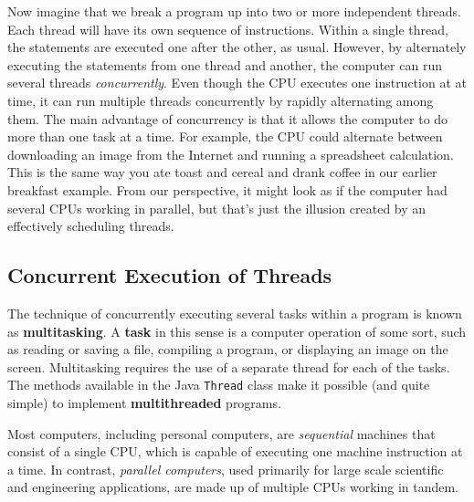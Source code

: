 Now imagine that we break a program up into two or more independent
threads.  Each thread will have its own sequence of instructions.
Within a single thread, the statements are executed one after the
other, as usual.  However, by alternately executing the statements
from one thread and another, the computer can run several threads {\it
concurrently}.  Even though the CPU executes one instruction at at
time, it can run multiple threads concurrently by rapidly alternating
among them. The main advantage of concurrency is that it allows the
computer to do more than one task at a time.  For example, the CPU
could alternate between downloading an image from the Internet and
running a spreadsheet calculation. This is the same way you ate toast
and cereal and drank coffee in our earlier breakfast example.  From
our perspective, it might look as if the computer had several CPUs
working in parallel, but that's just the illusion created by an
effectively scheduling threads.




\subsection{Concurrent Execution of Threads}
\noindent The technique of concurrently executing several tasks within a program
is known as {\bf multitasking}. A {\bf task} in this sense is a
computer operation of some sort, such as reading or saving a file,
compiling a program, or displaying an image on the screen.  Multitasking
requires the use of a separate thread for each of the tasks.  The
methods available in the Java {\tt Thread} class make it possible (and
quite simple) to implement {\bf multithreaded} programs.

Most computers, including personal computers, are {\it sequential}
machines that consist of a single CPU, which is capable of executing
one machine instruction at a time.  In contrast, {\it parallel
computers}, used primarily for large scale scientific and engineering
applications, are made up of multiple CPUs working in tandem.

